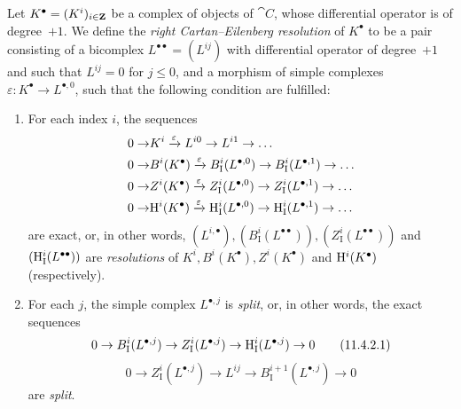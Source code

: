 \begin{env}[11.4.2]
\label{0.11.4.2}
Let $K^\bullet = (K^i)_{i\in\mathbf{Z}}$ be a complex of objects of $\cat{C}$, whose differential operator is of degree~$+1$.
We define the \emph{right Cartan--Eilenberg resolution} of $K^\bullet$ to be a pair consisting of a bicomplex $L^{\bullet\bullet} = (L^{ij})$ with differential operator of degree~$+1$ and such that $L^{ij}=0$ for $j\leq 0$, and a morphism of simple complexes $\varepsilon: K^\bullet \rightarrow L^{\bullet, 0}$, such that the following condition are fulfilled:
\begin{enumerate}
  \item[(i)] For each index $i$, the sequences
    \[
      \begin{aligned}
        0 \rightarrow
        & K^i
        \xrightarrow{\varepsilon} L^{i0}
        \rightarrow L^{i1}
        \rightarrow \ldots
      \\0 \rightarrow
        & B^i(K^\bullet)
        \xrightarrow{\varepsilon} B_\mathrm{I}^i(L^{\bullet,0})
        \rightarrow B_\mathrm{I}^i(L^{\bullet,1})
        \rightarrow \ldots
      \\0 \rightarrow
        & Z^i(K^\bullet)
        \xrightarrow{\varepsilon} Z_\mathrm{I}^i(L^{\bullet,0})
        \rightarrow Z_\mathrm{I}^i(L^{\bullet,1})
        \rightarrow \ldots
      \\0 \rightarrow
        & \mathrm{H}^i(K^\bullet)
        \xrightarrow{\varepsilon} \mathrm{H}_\mathrm{I}^i(L^{\bullet,0})
        \rightarrow \mathrm{H}_\mathrm{I}^i(L^{\bullet,1})
        \rightarrow \ldots
      \end{aligned}
    \]
    are exact, or, in other words, $(L^{i,\bullet}), (B_\mathrm{I}^i(L^{\bullet\bullet})), (Z_\mathrm{I}^i(L^{\bullet\bullet}))$ and $(\mathrm{H}_\mathrm{I}^i(L^{\bullet\bullet}))$ are \emph{resolutions} of $K^i, B^i(K^\bullet), Z^i(K^\bullet)$ and $\mathrm{H}^i(K^\bullet)$ (respectively).
  \item[(ii)] For each $j$, the simple complex $L^{\bullet, j}$ is \emph{split}, or, in other words, the exact sequences
    \[
      \label{0.11.4.2.1}
      0 \rightarrow B_\mathrm{I}^i(L^{\bullet,j}) \rightarrow Z_\mathrm{I}^i(L^{\bullet,j}) \rightarrow \mathrm{H}_\mathrm{I}^i(L^{\bullet,j}) \rightarrow 0
      \tag{11.4.2.1}
    \]
    \[
      \label{0.11.4.2.2}
      0 \rightarrow Z_\mathrm{I}^i(L^{\bullet,j}) \rightarrow L^{ij} \rightarrow B_\mathrm{I}^{i+1}(L^{\bullet,j}) \rightarrow 0
      \tag{11.4.2.2}
    \]
    are \emph{split}.
\end{enumerate}


\end{env}
